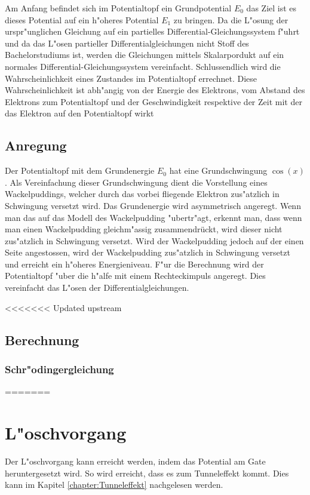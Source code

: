 \begin{refsection}
Am Anfang befindet sich im Potentialtopf ein Grundpotential $E_{0}$ das Ziel ist es dieses Potential auf ein h"oheres Potential $E_{1}$ zu bringen. Da die L"osung der urspr"unglichen Gleichung auf ein partielles Differential-Gleichungssystem f"uhrt und da das L"osen partieller Differentialgleichungen nicht Stoff des Bachelorstudiums ist, werden die Gleichungen mittels Skalarpordukt auf ein normales Differential-Gleichungssystem vereinfacht. Schlussendlich wird die Wahrscheinlichkeit eines Zustandes im Potentialtopf errechnet. Diese Wahrscheinlichkeit ist abh"angig von der Energie des Elektrons, vom Abstand des Elektrons zum Potentialtopf und der Geschwindigkeit respektive der Zeit mit der das Elektron auf den Potentialtopf wirkt 

\subsection{Anregung}
Der Potentialtopf mit dem Grundenergie $E_{0}$ hat eine Grundschwingung $\cos(x)$.
Als Vereinfachung dieser Grundschwingung dient die Vorstellung eines Wackelpuddings, welcher durch das vorbei fliegende Elektron zus"atzlich in Schwingung versetzt wird. 
Das Grundenergie wird asymmetrisch angeregt. Wenn man das auf das Modell des Wackelpudding "ubertr"agt, erkennt man, dass wenn man einen Wackelpudding gleichm"assig zusammendrückt, wird dieser nicht zus"atzlich in Schwingung versetzt. Wird der Wackelpudding jedoch auf der einen Seite angestossen, wird der Wackelpudding zus"atzlich in Schwingung versetzt und erreicht ein h"oheres Energieniveau.
F"ur die Berechnung wird der Potentialtopf "uber die h"alfe mit einem Rechteckimpuls angeregt. Dies vereinfacht das L"osen der Differentialgleichungen.

<<<<<<< Updated upstream
\subsection{Berechnung}
\subsubsection{Schr"odingergleichung}
=======
\section{L"oschvorgang}
Der L"oschvorgang kann erreicht werden, indem das Potential am Gate heruntergesetzt wird. So wird erreicht, dass es zum Tunneleffekt kommt. Dies kann im Kapitel \ref{chapter:Tunneleffekt} nachgelesen werden.



\end{refsection}

